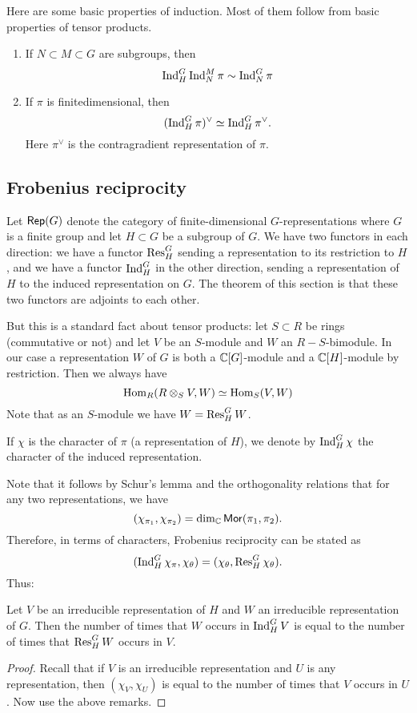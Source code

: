 \documentclass[11pt, english]{article}
\begin{document}
Here are some basic properties of induction. Most of them follow from basic properties of tensor products.

\begin{enumerate}
\item If $N \subset M \subset G$ are subgroups, then
$$
\operatorname{Ind}_H^G \operatorname{Ind}_N^M \pi \sim \operatorname{Ind}_N^G \pi
$$
\item If $\pi$ is finitedimensional, then
$$
(\operatorname{Ind}_H^G \pi)^\vee \simeq \operatorname{Ind}_H^G  \pi^\vee.
$$
Here $\pi^\vee$ is the contragradient representation of $\pi$.
\end{enumerate}

\subsection{Frobenius reciprocity}

Let $\mathsf{Rep}(G)$ denote the category of finite-dimensional $G$-representations where $G$ is a finite group and let $H \subset G$ be a subgroup of $G$. We have two functors in each direction: we have a functor $\operatorname{Res}_H^G$ sending a representation to its restriction to $H$, and we have a functor $\operatorname{Ind}_H^G$ in the other direction, sending a representation of $H$ to the induced representation on $G$. The theorem of this section is that these two functors are adjoints to each other.

But this is a standard fact about tensor products: let $S \subset R$ be rings (commutative or not) and let $V$ be an $S$-module and $W$ an $R-S$-bimodule. In our case a representation $W$ of $G$ is both a $\mathbb{C}[G]$-module and a $\mathbb{C}[H]$-module by restriction. Then we always have
$$
\operatorname{Hom}_R(R \otimes_S V,W) \simeq \operatorname{Hom}_S(V,W)
$$
Note that as an $S$-module we have $W=\operatorname{Res}_H^G W$. 

If $\chi$ is the character of $\pi$ (a representation of $H$), we denote by $\operatorname{Ind}_H^G \chi$ the character of the induced representation. 

Note that it follows by Schur's lemma and the orthogonality relations that for any two representations, we have
$$
(\chi_{\pi_1}, \chi_{\pi_2}) = \dim_{\mathbb{C}} \mathsf{Mor}(\pi_1,\pi_2).
$$
Therefore, in terms of characters, Frobenius reciprocity can be stated as 
$$
(\operatorname{Ind}_H^G \chi_\pi, \chi_\theta) = (\chi_\theta, \operatorname{Res}_H^G \chi_\theta).
$$
Thus:
\begin{prop}
Let $V$ be an irreducible representation of $H$ and $W$ an irreducible representation of $G$. Then the number of times that $W$ occurs in $\operatorname{Ind}_H^G V$ is equal to the number of times that $\operatorname{Res}_H^G W$ occurs in $V$.
\end{prop}
\begin{proof}
Recall that if $V$ is an irreducible representation and $U$ is any representation, then $(\chi_V,\chi_U)$ is equal to the number of times that $V$ occurs in $U$. Now use the above remarks.
\end{proof}
\end{document}
